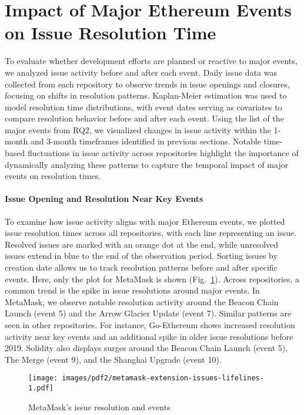 \section{Impact of Major Ethereum Events on Issue Resolution Time}\label{RQ3}

To evaluate whether development efforts are planned or reactive to major events, we analyzed issue activity before and after each event. Daily issue data was collected from each repository to observe trends in issue openings and closures, focusing on shifts in resolution patterns. Kaplan-Meier estimation was used to model resolution time distributions, with event dates serving as covariates to compare resolution behavior before and after each event. Using the list of the major events from RQ2, we visualized changes in issue activity within the 1-month and 3-month timeframes identified in previous sections. Notable time-based fluctuations in issue activity across repositories highlight the importance of dynamically analyzing these patterns to capture the temporal impact of major events on resolution times.

\paragraph{Issue Opening and Resolution Near Key Events}
To examine how issue activity aligns with major Ethereum events, we plotted issue resolution times across all repositories, with each line representing an issue. Resolved issues are marked with an orange dot at the end, while unresolved issues extend in blue to the end of the observation period. Sorting issues by creation date allows us to track resolution patterns before and after specific events. Here, only the plot for MetaMask is shown (Fig.~\ref{fig:lifelines-metamask}).
Across repositories, a common trend is the spike in issue resolutions around major events. In MetaMask, we observe notable resolution activity around the Beacon Chain Launch (event 5) and the Arrow Glacier Update (event 7). Similar patterns are seen in other repositories. For instance, Go-Ethereum shows increased resolution activity near key events and an additional spike in older issue resolutions before 2019. Solidity also displays surges around the Beacon Chain Launch (event 5), The Merge (event 9), and the Shanghai Upgrade (event 10). 

\begin{figure}
    \centering
    \texttt{[image: images/pdf2/metamask-extension-issues-lifelines-1.pdf]}
    \caption{MetaMask's issue resolution and events}
    \label{fig:lifelines-metamask}
\end{figure}

